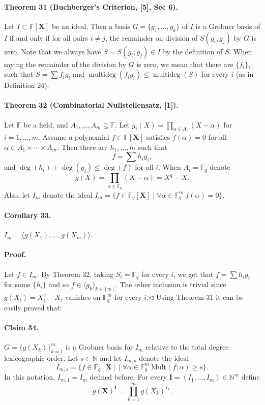 \documentclass[10pt,a4paper]{article}
\begin{document}
\paragraph{Theorem 31 (Buchberger's Criterion, [5], Sec 6).} Let $I\subset\mathbb F[\boldsymbol X]$ be an ideal. Then a basis $G=\{g_1,\ldots,g_k\}$ of $I$ is a Grobner basis of $I$ if and only if for all pairs $i\neq j$, the remainder on division of $S(g_i,g_j)$ by $G$ is zero.
Note that we always have $S=S(g_i,g_j)\in I$ by the definition of $S$. When saying the remainder of the division by $G$ is zero, we mean that there are $\{f_i\}$, such that $S=\sum f_ig_i$ and $\operatorname{multideg}(f_ig_i)\leq\operatorname{multideg}(S)$ for every $i$ (as in Definition 24).
\paragraph{Theorem 32 (Combinatorial Nullstellensatz, [1]).} Let $\mathbb F$ be a field, and $A_1,\ldots,A_m\subseteq\mathbb F$. Let $g_i(X)=\prod_{\alpha\in A_i}(X-\alpha)$ for $i=1,\ldots,m$. Assume a polynomial $f\in\mathbb F[\boldsymbol X]$ satisfies $f(\alpha)=0$ for all $\alpha\in A_1\times\cdots\times A_m$. Then there are $h_1,\ldots,h_t$ such that
\[f=\sum h_ig_i,\]
and $\deg(h_i)+\deg(g_i)\leq\deg(f)$ for all $i$.
When $A_i=\mathbb F_q$ denote
\[g(X)=\prod_{\alpha\in\mathbb F_q}(X-\alpha)=X^q-X.\]
Also, let $I_m$ denote the ideal $I_m=\{f\in\mathbb F_q[\boldsymbol X]\mid\forall\alpha\in\mathbb F_q^m\ f(\alpha)=0\}$.
\paragraph{Corollary 33.} $I_m=\langle g(X_1),\ldots,g(X_m)\rangle$.
\paragraph{Proof.} Let $f\in I_m$. By Theorem 32, taking $S_i=\mathbb F_q$ for every $i$, we get that $f=\sum h_ig_i$ for some $\{h_i\}$ and so $f\in\langle g_k\rangle_{k\in[m]}$. The other inclusion is trivial since $g(X_i)=X_i^q-X_i$ vanishes on $\mathbb F_q^m$ for every $i$.\hfill$\triangleleft$
Using Theorem 31 it can be easily proved that:
\paragraph{Claim 34.} $G=\{g(X_k)\}_{k=1}^m$ is a Grobner basis for $I_m$ relative to the total degree lexicographic order.
Let $s\in\mathbb N$ and let $I_{m,s}$ denote the ideal
\[I_{m,s}=\{f\in\mathbb F_q[\boldsymbol X]\mid\forall\alpha\in\mathbb F_q^m\ \mathrm{Mult}(f;\alpha)\geq s\}.\]
In this notation, $I_{m,1}=I_m$ defined before. For every $\boldsymbol I=(I_1,\ldots,I_m)\in\mathbb N^m$ define
\[g(\boldsymbol X)^{\boldsymbol I}=\prod_{k=1}^mg(X_k)^{I_k}.\]
\end{document}
